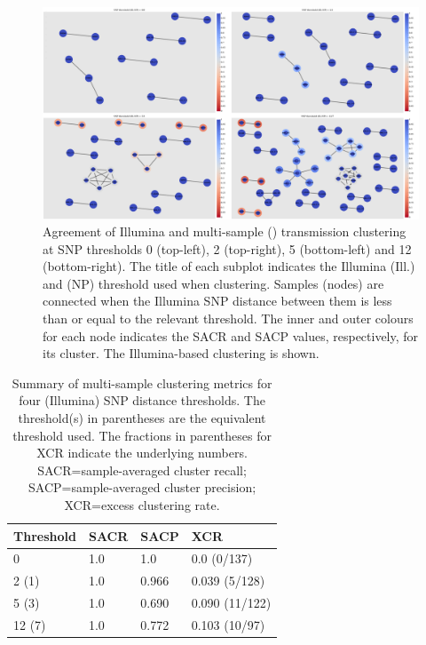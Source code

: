 \begin{figure}
\begin{center}
\includegraphics[width=0.90\columnwidth]{Chapter2/Figs/pandora_compare_clusters.png}
\caption{{Agreement of Illumina and \pandora{} multi-sample (\ont{}) transmission clustering at SNP thresholds 0 (top-left), 2 (top-right), 5 (bottom-left) and 12 (bottom-right). The title of each subplot indicates the Illumina (Ill.) and \ont{} (NP) threshold used when clustering. Samples (nodes) are connected when the Illumina SNP distance between them is less than or equal to the relevant threshold. The inner and outer colours for each node indicates the SACR and SACP values, respectively, for its cluster. The Illumina-based clustering is shown.
{\label{fig:compare-clusters}}%
}}
\end{center}
\end{figure}

\begin{table}
\centering
\begin{tabular}{@{}llll@{}}
\toprule
Threshold & SACR & SACP  & XCR            \\ \midrule
0         & 1.0  & 1.0   & 0.0 (0/137)    \\
2 (1)     & 1.0  & 0.966 & 0.039 (5/128)  \\
5 (3)     & 1.0  & 0.690 & 0.090 (11/122) \\
12 (7)    & 1.0  & 0.772 & 0.103 (10/97)  \\ \bottomrule
\end{tabular}
\caption{Summary of \pandora{} multi-sample clustering metrics for four (Illumina) SNP distance thresholds. The threshold(s) in parentheses are the \ont{} equivalent threshold used. The fractions in parentheses for XCR indicate the underlying numbers. SACR=sample-averaged cluster recall; SACP=sample-averaged cluster precision; XCR=excess clustering rate.}
\label{tab:compare-cluster-summary}
\end{table}

